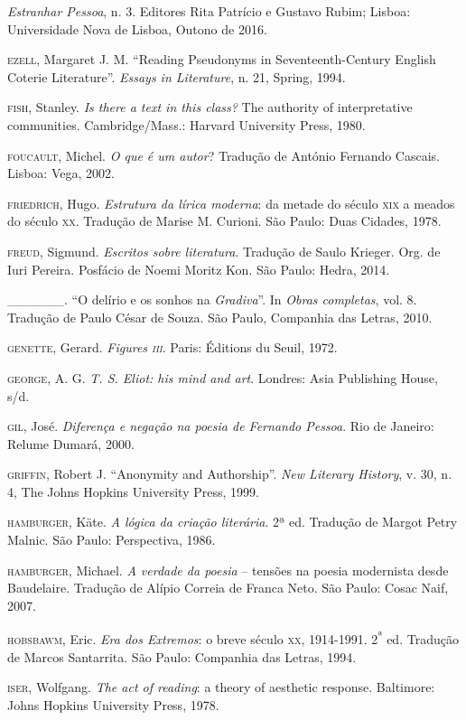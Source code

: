 \begin{hangparas}{.35in}{1}
\emph{Estranhar Pessoa}, n. 3. Editores Rita Patrício e Gustavo Rubim;
Lisboa: Universidade Nova de Lisboa, Outono de 2016.

\textsc{ezell}, Margaret J. M. ``Reading Pseudonyms in
Seventeenth-Century English Coterie Literature''. \emph{Essays in
Literature}, n. 21, Spring, 1994.

\textsc{fish}, Stanley. \emph{Is there a text in this class?} The
authority of interpretative communities. Cambridge/Mass.: Harvard
University Press, 1980.

\textsc{foucault}, Michel. \emph{O que é um autor}? Tradução de António
Fernando Cascais. Lisboa: Vega, 2002.

\textsc{friedrich}, Hugo. \emph{Estrutura da lírica moderna}: da metade
do século \textsc{xix} a meados do século \textsc{xx}. Tradução de
Marise M. Curioni. São Paulo: Duas Cidades, 1978.

\textsc{freud}, Sigmund. \emph{Escritos sobre literatura}. Tradução de
Saulo Krieger. Org. de Iuri Pereira. Posfácio de Noemi Moritz Kon. São
Paulo: Hedra, 2014.

\_\_\_\_\_\_. ``O delírio e os sonhos na \emph{Gradiva}''. In
\emph{Obras completas}, vol. 8. Tradução de Paulo César de Souza. São
Paulo, Companhia das Letras, 2010.

\textsc{genette}, Gerard. \emph{Figures \textsc{iii}}. Paris: Éditions
du Seuil, 1972.

\textsc{george}, A. G. \emph{T. S. Eliot: his mind and art}. Londres:
Asia Publishing House, s/d.

\textsc{gil}, José. \emph{Diferença e negação na poesia de Fernando
Pessoa}. Rio de Janeiro: Relume Dumará, 2000.

\textsc{griffin}, Robert J. ``Anonymity and Authorship''. \emph{New Literary
History}, v. 30, n. 4, The Johns Hopkins University Press, 1999.

\textsc{hamburger}, Käte. \emph{A lógica da criação literária}. 2ª ed.
Tradução de Margot Petry Malnic. São Paulo: Perspectiva, 1986.

\textsc{hamburger}, Michael. \emph{A verdade da poesia} -- tensões na
poesia modernista desde Baudelaire. Tradução de Alípio Correia de Franca
Neto. São Paulo: Cosac Naif, 2007.

\textsc{hobsbawm}, Eric. \emph{Era dos Extremos}: o breve século
\textsc{xx}, 1914-1991. 2\textsuperscript{ª} ed. Tradução de Marcos
Santarrita. São Paulo: Companhia das Letras, 1994.

\textsc{iser}, Wolfgang. \emph{The act of reading}: a theory of
aesthetic response. Baltimore: Johns Hopkins University Press, 1978.


\end{hangparas}
